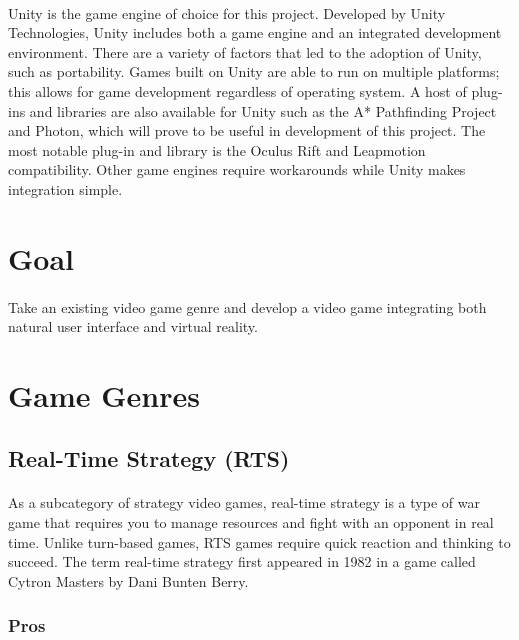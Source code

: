 \paragraph{} Unity is the game engine of choice for this project. Developed by Unity Technologies, Unity includes both a game engine and an integrated development environment. There are a variety of factors that led to the adoption of Unity, such as portability. Games built on Unity are able to run on multiple platforms; this allows for game development regardless of operating system. A host of plug-ins and libraries are also available for Unity such as the A* Pathfinding Project and Photon, which will prove to be useful in development of this project. The most notable plug-in and library is the Oculus Rift and Leapmotion compatibility. Other game engines require workarounds while Unity makes integration simple. 

\section{Goal}

\paragraph{} Take an existing video game genre and develop a video game integrating both natural user interface and virtual reality.

\section{Game Genres}

\subsection{Real-Time Strategy (RTS)}

\paragraph{} As a subcategory of strategy video games, real-time strategy is a type of war game that requires you to manage resources and fight with an opponent in real time. Unlike turn-based games, RTS games require quick reaction and thinking to succeed. The term real-time strategy first appeared in 1982 in a game called Cytron Masters by Dani Bunten Berry. 

\subsubsection{Pros}

